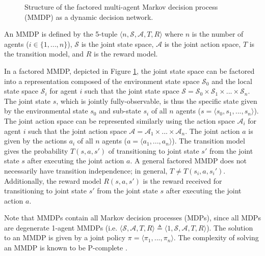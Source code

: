 \documentclass[letterpaper]{article}%
\begin{document}
\begin{figure}[t]
    \caption{Structure of the factored multi-agent Markov decision process (MMDP) as a dynamic decision network.}
    \label{fig:mmdp-ddn-diagram}
\end{figure}

An MMDP \cite{Boutilier1999SequentialSystems} is defined by the 5-tuple $\langle n, \mathcal{S}, \mathcal{A}, T, R \rangle$ where $n$ is the number of agents ($i \in \{1, ..., n\}$), $\mathcal{S}$ is the joint state space, $\mathcal{A}$ is the joint action space, $T$ is the transition model, and $R$ is the reward model. 

In a factored MMDP, depicted in Figure \ref{fig:mmdp-ddn-diagram}, the joint state space can be factored into a representation composed of the environment state space $\mathcal{S}_0$ and the local state space $\mathcal{S}_i$ for agent $i$ such that the joint state space $\mathcal{S} = \mathcal{S}_0 \times \mathcal{S}_1 \times ... \times \mathcal{S}_n$. The joint state $s$, which is jointly fully-observable, is thus the specific state given by the environmental state $s_0$ and sub-state $s_i$ of all $n$ agents ($s = \langle s_0, s_1, ..., s_n \rangle$).  The joint action space can be represented similarly using the action space $\mathcal{A}_i$ for agent $i$ such that the joint action space $\mathcal{A} = \mathcal{A}_1 \times ... \times \mathcal{A}_n$. The joint action $a$ is given by the actions $a_i$ of all $n$ agents ($a = \langle a_1, ..., a_n \rangle$). The transition model gives the probability $T(s, a, s')$ of transitioning to joint state $s'$ from the joint state $s$ after executing the joint action $a$. A general factored MMDP does not necessarily have transition independence; in general, $T \neq T(s_i, a, s_i')$. Additionally, the reward model $R(s, a, s')$ is the reward received for transitioning to joint state $s'$ from the joint state $s$ after executing the joint action $a$. 

Note that MMDPs contain all Markov decision processes (MDPs), since all MDPs are degenerate 1-agent MMDPs (i.e. $\langle \mathcal{S}, \mathcal{A}, T, R \rangle \triangleq \langle 1, \mathcal{S}, \mathcal{A}, T, R \rangle$). The solution to an MMDP is given by a joint policy $\pi = \langle \pi_1, ..., \pi_n \rangle$.  The complexity of solving an MMDP is known to be P-complete \cite{Papadimitriou1987TheProcesses}.
\end{document}
